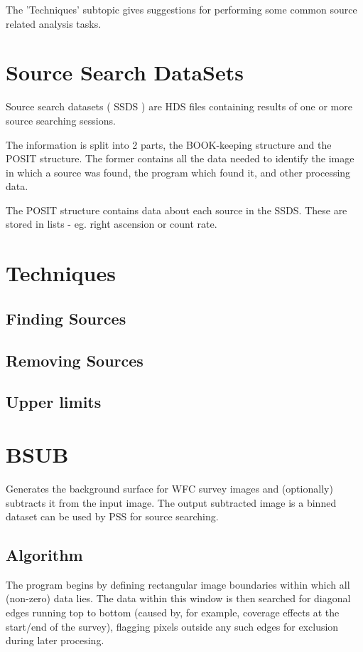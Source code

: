 \documentclass{book}
\renewcommand{\_}{{\tt\char'137}}     %
\begin{document}
The 'Techniques' subtopic gives suggestions for performing some
common source related analysis tasks.

\section{Source Search DataSets}
Source search datasets ( SSDS ) are HDS files containing results
of one or more source searching sessions.

The information is split into 2 parts, the BOOK-keeping structure
and the POSIT structure. The former contains all the data needed
to identify the image in which a source was found, the program
which found it, and other processing data.

The POSIT structure contains data about each source in the SSDS.
These are stored in lists - eg. right ascension or count rate.

\section{Techniques}
\subsection{Finding Sources}
\subsection{Removing Sources}
\subsection{Upper limits}
\section{BSUB}
Generates the background surface for WFC survey images and (optionally)
subtracts it from the input image. The output subtracted image is a
binned dataset can be used by PSS for source searching.
\subsection{Algorithm}
The program begins by defining rectangular image boundaries within which
all (non-zero) data lies. The data within this window is then searched
for diagonal edges running top to bottom (caused by, for example,
coverage effects at the start/end of the survey), flagging pixels outside
any such edges for exclusion during later procesing.
\end{document}
